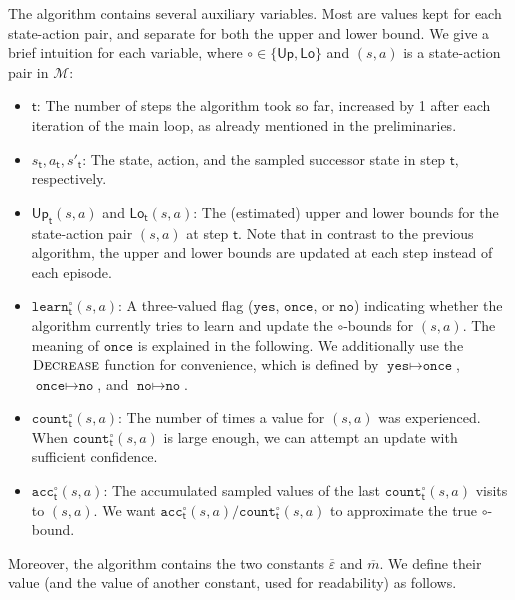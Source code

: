 \documentclass{theoretics}
\newcommand{\MDP}{\mathcal{M}}
\newcommand{\upperbound}{\mathsf{Up}}
\newcommand{\lowerbound}{\mathsf{Lo}}
\newcommand{\updatestep}{{\overline{\varepsilon}}}
\newcommand{\delay}{{\overline{m}}}
\newcommand{\acc}{\texttt{acc}}
\newcommand{\visitcount}{\texttt{count}}
\newcommand{\learn}{\texttt{learn}}
\newcommand{\learnyes}{\texttt{yes}}
\newcommand{\learnonce}{\texttt{once}}
\newcommand{\learnno}{\texttt{no}}
\newcommand{\learndecrease}{\textsc{Decrease}}
\newcommand{\algostep}{\mathsf{t}}
\begin{document}
The algorithm contains several auxiliary variables.
Most are values kept for each state-action pair, and separate for both the upper and lower bound.
We give a brief intuition for each variable, where $\circ \in \{\upperbound, \lowerbound\}$ and $(s, a)$ is a state-action pair in $\MDP$:
\begin{itemize}
	\item
	$\algostep$: The number of steps the algorithm took so far, increased by 1 after each iteration of the main loop, as already mentioned in the preliminaries.

	\item
	$s_\algostep, a_\algostep, s'_\algostep$:
	The state, action, and the sampled successor state in step $\algostep$, respectively.
	\item
	$\upperbound_\algostep(s, a)$ and $\lowerbound_\algostep(s, a)$:
	The (estimated) upper and lower bounds for the state-action pair $(s, a)$ at step $\algostep$.
	Note that in contrast to the previous algorithm, the upper and lower bounds are updated at each step instead of each episode.
	\item
	$\learn^\circ_\algostep(s, a)$:
	A three-valued flag ($\learnyes$, $\learnonce$, or $\learnno$) indicating whether the algorithm currently tries to learn and update the $\circ$-bounds for $(s, a)$.
	The meaning of $\learnonce$ is explained in the following.
	We additionally use the $\learndecrease$ function for convenience, which is defined by $\learnyes \mapsto \learnonce$, $\learnonce \mapsto \learnno$, and $\learnno \mapsto \learnno$.
	\item
	$\visitcount^\circ_\algostep(s, a)$:
	The number of times a value for $(s, a)$ was experienced.
	When $\visitcount^\circ_\algostep(s, a)$ is large enough, we can attempt an update with sufficient confidence.
	\item
	$\acc^\circ_\algostep(s, a)$:
	The accumulated sampled values of the last $\visitcount_\algostep^\circ(s, a)$ visits to $(s, a)$.
	We want $\acc^\circ_\algostep(s, a) / \visitcount_\algostep^\circ(s, a)$ to approximate the true $\circ$-bound.
\end{itemize}
Moreover, the algorithm contains the two constants $\updatestep$ and $\delay$.
We define their value (and the value of another constant, used for readability) as follows.
\end{document}
